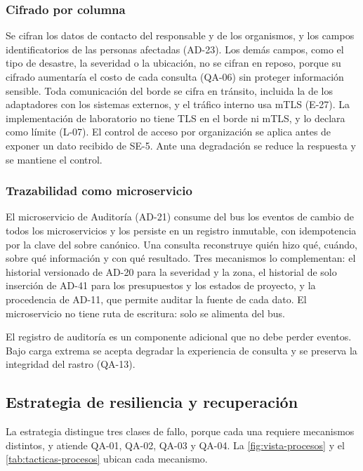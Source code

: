 \documentclass[11pt,letterpaper]{article}
\begin{document}
\subsubsection*{Cifrado por columna}

Se cifran los datos de contacto del responsable y de los organismos,
y los campos identificatorios de las personas afectadas (AD-23). Los demás campos, como el
tipo de desastre, la severidad o la ubicación, no se cifran en reposo, porque su cifrado
aumentaría el costo de cada consulta (QA-06) sin proteger información sensible. Toda
comunicación del borde se cifra en tránsito, incluida la de los adaptadores con los sistemas
externos, y el tráfico interno usa mTLS (E-27). La implementación de laboratorio no tiene TLS en
el borde ni mTLS, y lo declara como límite (L-07). El control de acceso por organización se aplica antes de exponer un dato recibido
de SE-5. Ante una degradación se reduce la respuesta y se mantiene el control.
\subsubsection*{Trazabilidad como microservicio}

El microservicio de Auditoría (AD-21) consume del bus los
eventos de cambio de todos los microservicios y los persiste en un registro inmutable, con
idempotencia por la clave del sobre canónico. Una consulta reconstruye quién hizo qué,
cuándo, sobre qué información y con qué resultado. Tres mecanismos lo complementan: el
historial versionado de AD-20 para la severidad y la zona, el historial de solo inserción
de AD-41 para los presupuestos y los estados de proyecto, y la procedencia de AD-11, que
permite auditar la fuente de cada dato. El microservicio no tiene ruta de escritura: solo
se alimenta del bus.

El registro de auditoría es un componente adicional que no debe perder eventos. Bajo carga extrema
se acepta degradar la experiencia de consulta y se preserva la integridad del rastro (QA-13).

\subsection{Estrategia de resiliencia y recuperación}
\label{sec:est-resiliencia}

La estrategia distingue tres clases de fallo, porque cada una requiere mecanismos distintos, y
atiende QA-01, QA-02, QA-03 y QA-04. La \cref{fig:vista-procesos} y el \cref{tab:tacticas-procesos}
ubican cada mecanismo.
\end{document}
